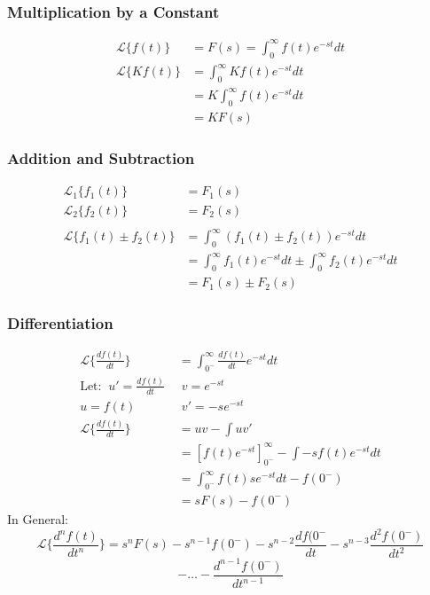 \documentclass[a5paper]{article}
\newcommand{\Lap}{\mathcal{L}}
\begin{document}
	\subsubsection{Multiplication by a Constant}
	\begin{align*}
		\Lap\{f(t)\}&=F(s)=\int^{\infty}_{0}f(t)e^{-st}dt\\
		\Lap\{Kf(t)\}&=\int^{\infty}_{0}Kf(t)e^{-st}dt\\\
		&=K\int^{\infty}_{0}f(t)e^{-st}dt\\
		&=KF(s)
	\end{align*}
	\subsubsection{Addition and Subtraction}
	\begin{align*}
		\Lap_{1}\{f_{1}(t)\}&=F_{1}(s)\\
		\Lap_{2}\{f_{2}(t)\}&=F_{2}(s)\\\\
		\Lap\{f_{1}(t)\pm f_{2}(t)\}&=\int^{\infty}_{0}(f_{1}(t)\pm f_{2}(t))e^{-st}dt\\
		&=\int^{\infty}_{0}f_{1}(t)e^{-st}dt\pm\int^{\infty}_{0}f_{2}(t)e^{-st}dt\\
		&=F_{1}(s)\pm F_{2}(s)
	\end{align*}
	\subsubsection{Differentiation}
	\begin{align*}
		\Lap\{\frac{df(t)}{dt}\}&=\int^{\infty}_{0^{-}}\frac{df(t)}{dt}e^{-st}dt\\
		\text{Let:}\;\;u'=\frac{df(t)}{dt}\;&\;v=e^{-st}\\
		u=f(t)\;&\;v'=-se^{-st}\\
		\Lap\{\frac{df(t)}{dt}\}&=uv-\int uv'\\
		&=[f(t)e^{-st}]^{\infty}_{0^{-}}-\int-sf(t)e^{-st}dt\\
		&=\int^{\infty}_{0^{-}}f(t)se^{-st}dt-f(0^{-})\\
		&=sF(s)-f(0^{-})
	\end{align*}
	In General:
	$$\Lap\{\frac{d^{n}f(t)}{dt^{n}}\}=s^{n}F(s)-s^{n-1}f(0^{-})-s^{n-2}\frac{df(0^{-}}{dt}-s^{n-3}\frac{d^{2}f(0^{-})}{dt^{2}}$$
	$$-\ldots-\frac{d^{n-1}f(0^{-})}{dt^{n-1}}$$
\end{document}

